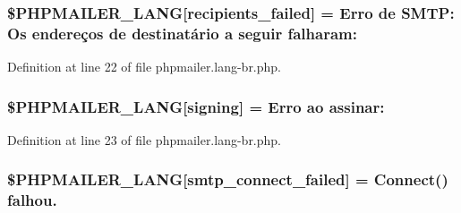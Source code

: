 \subsubsection[{\texorpdfstring{\$\+P\+H\+P\+M\+A\+I\+L\+E\+R\+\_\+\+L\+A\+NG}{$PHPMAILER_LANG}}]{\setlength{\rightskip}{0pt plus 5cm}\$P\+H\+P\+M\+A\+I\+L\+E\+R\+\_\+\+L\+A\+NG\mbox{[}\textquotesingle{}recipients\+\_\+failed\textquotesingle{}\mbox{]} = \textquotesingle{}Erro de S\+M\+T\+P\+: Os endereços de destinatário {\bf a} seguir falharam\+: \textquotesingle{}}\hypertarget{phpmailer_8lang-br_8php_a7589d30bb9b368327c2df015f3e6bcba}{}\label{phpmailer_8lang-br_8php_a7589d30bb9b368327c2df015f3e6bcba}


Definition at line 22 of file phpmailer.\+lang-\/br.\+php.

\subsubsection[{\texorpdfstring{\$\+P\+H\+P\+M\+A\+I\+L\+E\+R\+\_\+\+L\+A\+NG}{$PHPMAILER_LANG}}]{\setlength{\rightskip}{0pt plus 5cm}\$P\+H\+P\+M\+A\+I\+L\+E\+R\+\_\+\+L\+A\+NG\mbox{[}\textquotesingle{}signing\textquotesingle{}\mbox{]} = \textquotesingle{}Erro ao assinar\+: \textquotesingle{}}\hypertarget{phpmailer_8lang-br_8php_a68e437bdb9b968a5a67320f03d231565}{}\label{phpmailer_8lang-br_8php_a68e437bdb9b968a5a67320f03d231565}


Definition at line 23 of file phpmailer.\+lang-\/br.\+php.

\subsubsection[{\texorpdfstring{\$\+P\+H\+P\+M\+A\+I\+L\+E\+R\+\_\+\+L\+A\+NG}{$PHPMAILER_LANG}}]{\setlength{\rightskip}{0pt plus 5cm}\$P\+H\+P\+M\+A\+I\+L\+E\+R\+\_\+\+L\+A\+NG\mbox{[}\textquotesingle{}smtp\+\_\+connect\+\_\+failed\textquotesingle{}\mbox{]} =  Connect() falhou.\textquotesingle{}}\hypertarget{phpmailer_8lang-br_8php_a7b321d4ca1e9df702403ed4c61aa0980}{}\label{phpmailer_8lang-br_8php_a7b321d4ca1e9df702403ed4c61aa0980}


